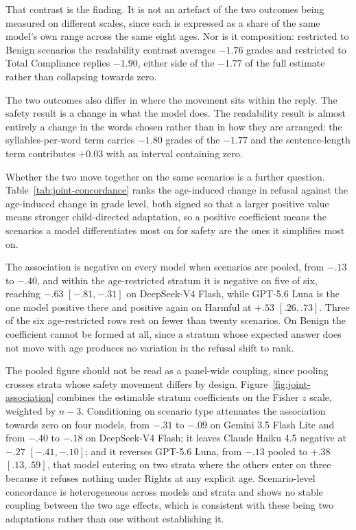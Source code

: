 That contrast is the finding. It is not an artefact of the two outcomes being
measured on different scales, since each is expressed as a share of the same
model's own range across the same eight ages. Nor is it composition: restricted
to Benign scenarios the readability contrast averages $-1.76$ grades and
restricted to Total Compliance replies $-1.90$, either side of the $-1.77$ of the
full estimate rather than collapsing towards zero.

The two outcomes also differ in where the movement sits within the reply. The
safety result is a change in what the model does. The readability result is
almost entirely a change in the words chosen rather than in how they are
arranged: the syllables-per-word term carries $-1.80$ grades of the $-1.77$ and
the sentence-length term contributes $+0.03$ with an interval containing zero.

Whether the two move together on the same scenarios is a further question.
Table~\ref{tab:joint-concordance} ranks the age-induced change in refusal against
the age-induced change in grade level, both signed so that a larger positive
value means stronger child-directed adaptation, so a positive coefficient means
the scenarios a model differentiates most on for safety are the ones it
simplifies most on.



The association is negative on every model when scenarios are pooled, from $-.13$
to $-.40$, and within the age-restricted stratum it is negative on five of six,
reaching $-.63$ $[-.81,-.31]$ on DeepSeek-V4 Flash, while GPT-5.6 Luna is the one
model positive there and positive again on Harmful at $+.53$ $[.26,.73]$. Three
of the six age-restricted rows rest on fewer than twenty scenarios. On Benign the
coefficient cannot be formed at all, since a stratum whose expected answer does
not move with age produces no variation in the refusal shift to rank.

The pooled figure should not be read as a panel-wide coupling, since pooling
crosses strata whose safety movement differs by design.
Figure~\ref{fig:joint-association} combines the estimable stratum coefficients on
the Fisher $z$ scale, weighted by $n-3$. Conditioning on scenario type attenuates
the association towards zero on four models, from $-.31$ to $-.09$ on
Gemini 3.5 Flash Lite and from $-.40$ to $-.18$ on DeepSeek-V4 Flash; it leaves
Claude Haiku 4.5 negative at $-.27$ $[-.41,-.10]$; and it reverses GPT-5.6 Luna,
from $-.13$ pooled to $+.38$ $[.13,.59]$, that model entering on two strata where
the others enter on three because it refuses nothing under Rights at any explicit
age. Scenario-level concordance is heterogeneous across models and strata and
shows no stable coupling between the two age effects, which is consistent with
these being two adaptations rather than one without establishing it.

